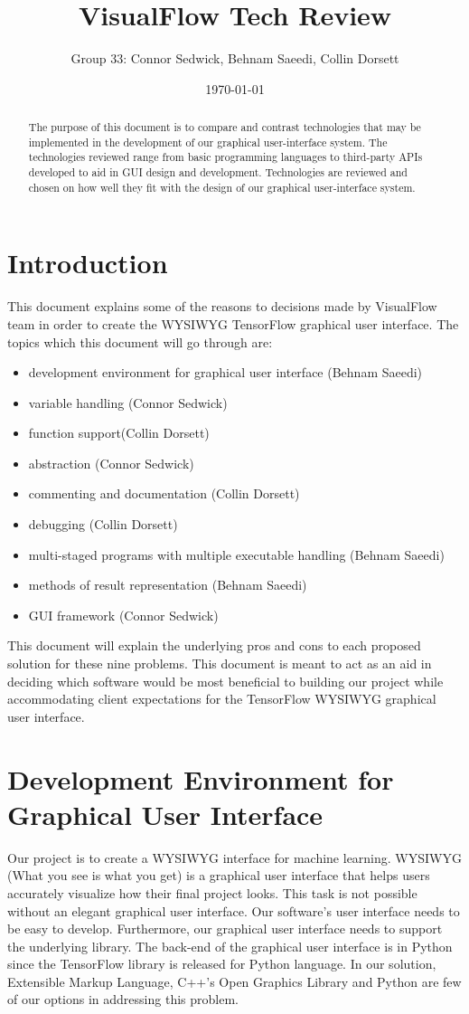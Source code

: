 \documentclass[journal,10pt,onecolumn,compsoc]{IEEEtran} \usepackage[margin=1.0in]{geometry} \usepackage{pdfpages} \usepackage{graphicx}
\title{VisualFlow Tech Review}
\author{Group 33: Connor Sedwick, Behnam Saeedi, Collin Dorsett}
\date{\today}
\begin{document}
\maketitle
\begin{abstract}
The purpose of this document is to compare and contrast technologies that may be implemented in the development of our graphical user-interface system. 
The technologies reviewed range from basic programming languages to third-party APIs developed to aid in GUI design and development.
Technologies are reviewed and chosen on how well they fit with the design of our graphical user-interface system.
\end{abstract}
\newpage
\tableofcontents
\newpage
\section{Introduction}
This document explains some of the reasons to decisions made by VisualFlow team in order to create the WYSIWYG TensorFlow graphical user interface.
The topics which this document will go through are:
\begin{itemize}
\item development environment for graphical user interface (Behnam Saeedi)
\item variable handling (Connor Sedwick)
\item function support(Collin Dorsett)
\item abstraction (Connor Sedwick)
\item commenting and documentation (Collin Dorsett)
\item debugging (Collin Dorsett)
\item multi-staged programs with multiple executable handling (Behnam Saeedi)
\item  methods of result representation (Behnam Saeedi)
\item GUI framework (Connor Sedwick)
\end{itemize}
\noindent This document will explain the underlying pros and cons to each proposed solution for these nine problems.
This document is meant to act as an aid in deciding which software would be most beneficial to building our project while accommodating client expectations for the TensorFlow WYSIWYG graphical user interface.
\newpage

\section{Development Environment for Graphical User Interface}
\noindent Our project is to create a WYSIWYG interface for machine learning. 
WYSIWYG (What you see is what you get) is a graphical user interface that helps users accurately visualize how their final project looks. 
This task is not possible without an elegant graphical user interface. 
Our software's user interface needs to be easy to develop. 
Furthermore, our graphical user interface needs to support the underlying library. 
The back-end of the graphical user interface is in Python since the TensorFlow library is released for Python language. 
In our solution, Extensible Markup Language, C++'s Open Graphics Library and Python are few of our options in addressing this problem.
\end{document}
